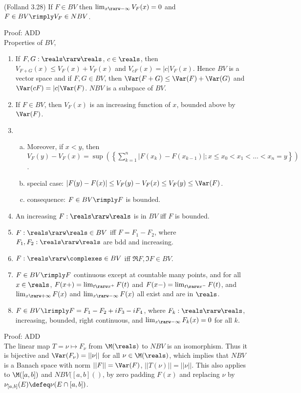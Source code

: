 (Folland 3.28) If $F \in BV$ then $\lim_{x \rarw - \infty} V_F(x) = 0$ and $F \in BV \rimply V_F \in NBV$.

\noindent
Proof: ADD \\


Properties of $BV$,

\begin{enumerate}[1)]
\item
If $F,G: \reals \rarw \reals$, $c \in \reals$, then $V_{F+G}(x) \le V_F(x) + V_F(x)$ and $V_{cF}(x) = |c| V_F(x)$. Hence $BV$ is a vector space and if $F,G \in BV$, then $\Var(F+G) \le \Var(F) + \Var(G)$ and $\Var(cF) = |c| \Var(F)$. $NBV$ is a subspace of $BV$.
\item
If $F \in BV$, then $V_F(x)$ is an increasing function of $x$, bounded above by $\Var(F)$.
\item
\begin{enumerate}[a)]
\item
Moreover, if $x < y$, then $V_F(y)-V_F(x) = \sup \left( \left\{ \sum_{k=1}^n | F(x_k) - F(x_{k-1}) | ; x \le x_0 < x_1 < ... < x_{n} = y \right\} \right)$.
\item
special case: $|F(y) - F(x)| \le V_F(y) - V_F(x) \le V_F(y) \le \Var(F)$.
\item
consequence: $F \in BV \rimply F$ is bounded.
\end{enumerate}
\item
An increasing $F: \reals \rarw \reals$ is in $BV$ iff $F$ is bounded.
\item
$F: \reals \rarw \reals \in BV$ iff $F =  F_1-F_2$, where $F_1,F_2: \reals \rarw \reals$ are bdd and increasing.
\item
$F: \reals \rarw \complexes \in BV$ iff $\Re F, \Im F \in BV$.
\item
$F \in BV \rimply F$ continuous except at countable many points, and for all $x \in \reals$, $F(x+) = \lim_{t \rarw x^+} F(t)$ and $F(x-) = \lim_{t \rarw x^-} F(t)$, and $\lim_{x \rarw +\infty} F(x)$ and $\lim_{x \rarw -\infty} F(x)$ all exist and are in $\reals$.
\item
 $F \in BV \lrimply F = F_1 - F_2 + i F_3 - i F_4$, where $F_k : \reals \rarw \reals$, increasing, bounded, right continuous, and $\lim_{x \rarw - \infty} F_k(x) = 0$ for all $k$.
\end{enumerate}


\noindent
Proof: ADD \\


The linear map $T = \nu \mapsto F_\nu$ from $\M(\reals)$ to $NBV$ is an isomorphism. Thus it is bijective and $\Var(F_\nu) = ||\nu||$ for all $\nu \in \M(\reals)$, which implies that $NBV$ is a Banach space with norm $||F|| = \Var(F)$, $||T(\nu)|| = ||\nu||$.  This also applies to $\M([a,b])$ and $NBV([a,b]()$, by zero padding $F(x)$ and replacing $\nu$ by $\nu_{[a,b]}(E) \defeq \nu(E \cap [a,b])$. \\


